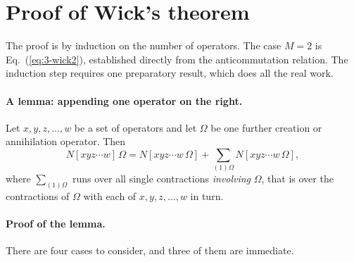 \section{Proof of Wick's theorem}
\label{sec:wickproof}

The proof is by induction on the number of operators.  The case $M=2$ is
Eq.~(\ref{eq:3-wick2}), established directly from the anticommutation
relation.  The induction step requires one preparatory result, which does all
the real work.

\paragraph{A lemma: appending one operator on the right.}
Let $x,y,z,\dots,w$ be a set of operators and let $\Omega$ be one further
creation or annihilation operator.  Then
\begin{equation}
  N\left[xyz\cdots w\right]\,\Omega
   = N\left[xyz\cdots w\,\Omega\right]
   + \sum_{(1)\Omega} N\left[xyz\cdots w\,\Omega\right] ,
  \label{eq:3-lemma}
\end{equation}
where $\sum_{(1)\Omega}$ runs over all single contractions \emph{involving}
$\Omega$, that is over the contractions of $\Omega$ with each of
$x,y,z,\dots,w$ in turn.

\paragraph{Proof of the lemma.}
There are four cases to consider, and three of them are immediate.

